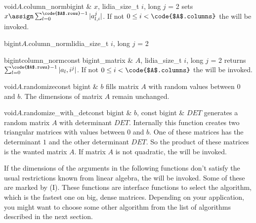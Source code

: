 {\begin{fcode}{void}{$A$.column_norm}{bigint & $x$, lidia_size_t $i$, long $j$ = 2}
  sets $x \assign \sum_{l=0}^{\code{$A$.rows}-1} |a_{l,i}^j|$.  If not $0 \leq i <
  \code{$A$.columns}$ the \LEH will be invoked.
\end{fcode}

\begin{fcode}{bigint}{$A$.column_norm}{lidia_size_t $i$, long $j$ = 2}
\end{fcode}

\begin{fcode}{bigint}{column_norm}{const bigint_matrix & $A$, lidia_size_t $i$, long $j$ = 2}
  returns $\sum_{l=0}^{\code{$A$.rows}-1} |a_l,i^j|$.  If not $0 \leq i < \code{$A$.columns}$
  the \LEH will be invoked.
\end{fcode}




\begin{fcode}{void}{$A$.randomize}{const bigint & $b$}
  fills matrix $A$ with random values between $0$ and $b$.  The dimensions of matrix $A$ remain
  unchanged.
\end{fcode}

\begin{fcode}{void}{$A$.randomize_with_det}{const bigint & $b$, const bigint & $\mathit{DET}$}
  generates a random matrix $A$ with determinant $\mathit{DET}$.  Internally this function
  creates two triangular matrices with values between $0$ and $b$.  One of these matrices has
  the determinant $1$ and the other determinant $\mathit{DET}$.  So the product of these
  matrices is the wanted matrix $A$.  If matrix $A$ is not quadratic, the \LEH will be invoked.
\end{fcode}




If the dimensions of the arguments in the following functions don't satisfy the usual
restrictions known from linear algebra, the \LEH will be invoked.  Some of these are marked by
(I).  These functions are interface functions to select the algorithm, which is the fastest one
on big, dense matrices.  Depending on your application, you might want to choose some other
algorithm from the list of algorithms described in the next section.

}

